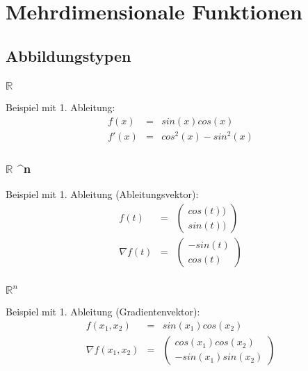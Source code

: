 
\section{Mehrdimensionale Funktionen} %
\label{sec:mehrdimensionale_funktionen}
\subsection{Abbildungstypen} %
\label{sub:abbildungstypen}

\subsubsection{$\mathbb{R}$ \rightarrow {}}
\label{ssub:r_rightarrow_r}
Beispiel mit 1. Ableitung:
\begin{eqnarray*}
	f(x) &=& sin(x)cos(x) \\
	f'(x) &=& cos^2(x)-sin^2(x)
\end{eqnarray*}

\subsubsection{$\mathbb{R}$ \rightarrow {}^n}
\label{ssub:r_rightarrow_r}
Beispiel mit 1. Ableitung (Ableitungsvektor):
\begin{eqnarray*}
	f(t) &=& \left(\begin{array}{c} cos(t)) \\ sin(t))\end{array}\right) \\
	\nabla f(t) &=& \left( \begin{array}{c} -sin(t) \\ cos(t)\end{array} \right)
\end{eqnarray*}

\subsubsection{$\mathbb{R}^n$ \rightarrow {}}
\label{ssub:r_rightarrow_r}
Beispiel mit 1. Ableitung (Gradientenvektor):
\begin{eqnarray*}
	f(x_1,x_2) &=& sin(x_1)cos(x_2) \\
	\nabla f(x_1,x_2) &=& \left( \begin{array}{c} cos(x_1) cos(x_2) \\ -sin(x_1)sin(x_2) \end{array} \right)
\end{eqnarray*}
	
